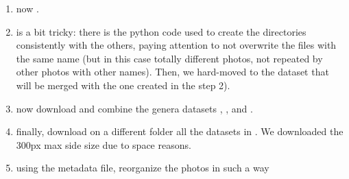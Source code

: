 \documentclass[conference]{IEEEtran}
\begin{document}
\begin{enumerate}
	\item now \cite{kaggle_mushrooms_classification_gaurav}.
	
	\item \cite{kaggle_multiinput_mushroom} is a bit tricky: there is the python code used to create the directories consistently with the others, paying attention to not overwrite the files with the same name (but in this case totally different photos, not repeated by other photos with other names). Then, we hard-moved to the dataset that will be merged with the one created in the step 2).
	
	\item now download and combine the genera datasets \cite{kaggle_mushroom_common_genus}, \cite{kaggle_mushroom_classification_lizhecheng}, \cite{kaggle_deepmushroom} and \cite{kaggle_mushroom_gcarbondioxide}.
	
	\item finally, download on a different folder all the datasets in \cite{danish_fungi_dataset}. We downloaded the 300px max side size due to space reasons.
	
	\item using the metadata file, reorganize the photos in such a way  
\end{enumerate}
\end{document}
